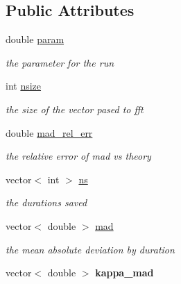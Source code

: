 \subsection*{Public Attributes}
\begin{DoxyCompactItemize}
\item 
\mbox{\label{structKappaResult_ac8485e1a2316db98a89d0aecc39e3389}} 
double \mbox{\hyperlink{structKappaResult_ac8485e1a2316db98a89d0aecc39e3389}{param}}
\begin{DoxyCompactList}\small\item\em the parameter for the run \end{DoxyCompactList}\item 
\mbox{\label{structKappaResult_a0f841a8ac328e4e7ec24089d31d63efb}} 
int \mbox{\hyperlink{structKappaResult_a0f841a8ac328e4e7ec24089d31d63efb}{nsize}}
\begin{DoxyCompactList}\small\item\em the size of the vector pased to fft \end{DoxyCompactList}\item 
double \mbox{\hyperlink{structKappaResult_a9fb1e6cd969e50ab18dae7fbf598f949}{mad\+\_\+rel\+\_\+err}}
\begin{DoxyCompactList}\small\item\em the relative error of mad vs theory \end{DoxyCompactList}\item 
vector$<$ int $>$ \mbox{\hyperlink{structKappaResult_a48d379e6c356ee537839917a67a21c86}{ns}}
\begin{DoxyCompactList}\small\item\em the durations saved \end{DoxyCompactList}\item 
\mbox{\label{structKappaResult_a43fdcc9f455335e136cb46d2506a14dd}} 
vector$<$ double $>$ \mbox{\hyperlink{structKappaResult_a43fdcc9f455335e136cb46d2506a14dd}{mad}}
\begin{DoxyCompactList}\small\item\em the mean absolute deviation by duration \end{DoxyCompactList}\item 
\mbox{\label{structKappaResult_abdbafd17d772e9821b31905d6389c22f}} 
vector$<$ double $>$ {\bfseries kappa\+\_\+mad}

\end{DoxyCompactItemize}
